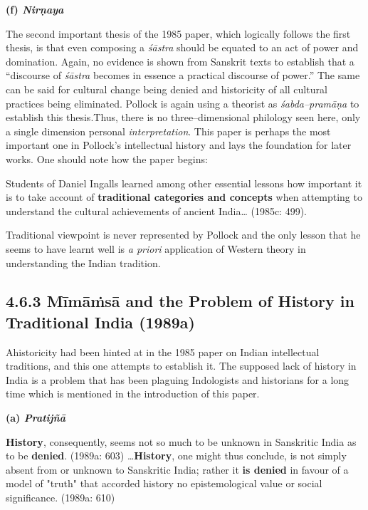 \textbf{(f) \textit{Nirṇaya}}

The second important thesis of the 1985 paper, which logically follows the first thesis, is that even composing a \textit{śāstra} should be equated to an act of power and domination. Again, no evidence is shown from Sanskrit texts to establish that a “discourse of \textit{śāstra} becomes in essence a practical discourse of power.” The same can be said for cultural change being denied and historicity of all cultural practices being eliminated. Pollock is again using a theorist as \textit{śabda–pramāṇa} to establish this thesis.Thus, there is no three–dimensional philology seen here, only a single dimension personal \textit{interpretation}. This paper is perhaps the most important one in Pollock’s intellectual history and lays the foundation for later works. One should note how the paper begins:

\begin{myquote}
Students of Daniel Ingalls learned among other essential lessons how important it is to take account of \textbf{traditional categories and concepts} when attempting to understand the cultural achievements of ancient India… (1985c: 499).
\end{myquote}

Traditional viewpoint is never represented by Pollock and the only lesson that he seems to have learnt well is \textit{a priori} application of Western theory in understanding the Indian tradition.

\vspace{-.3cm}

\subsection*{4.6.3 Mīmāṁsā and the Problem of History in Traditional India (1989a)}

\vspace{-.3cm}

Ahistoricity had been hinted at in the 1985 paper on Indian intellectual traditions, and this one attempts to establish it. The supposed lack of history in India is a problem that has been plaguing Indologists and historians for a long time which is mentioned in the introduction of this paper.

\textbf{(a) \textit{Pratijñā }}

\begin{myquote}
\textbf{History}, consequently, seems not so much to be unknown in Sanskritic India as to be \textbf{denied}. (1989a: 603) …\textbf{History}, one might thus conclude, is not simply absent from or unknown to Sanskritic India; rather it \textbf{is denied} in favour of a model of "truth" that accorded history no epistemological value or social significance. (1989a: 610)
\end{myquote}


